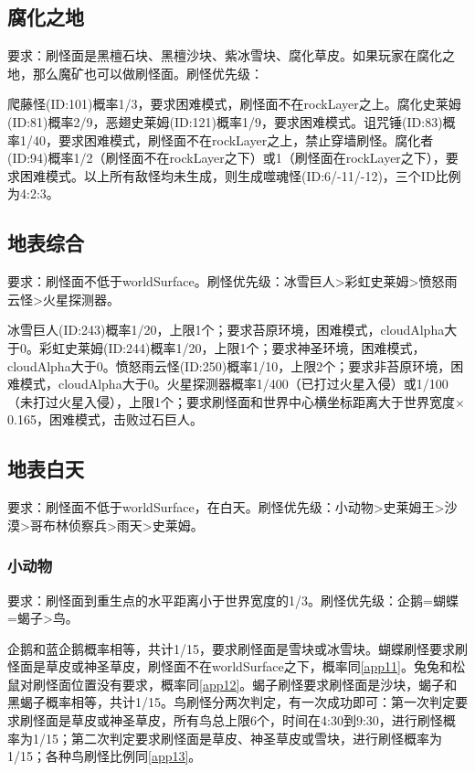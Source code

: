 \subsection{腐化之地}
要求：刷怪面是黑檀石块、黑檀沙块、紫冰雪块、腐化草皮。如果玩家在腐化之地，那么魔矿也可以做刷怪面。刷怪优先级：

爬藤怪(ID:101)概率1/3，要求困难模式，刷怪面不在rockLayer之上。腐化史莱姆(ID:81)概率2/9，恶翅史莱姆(ID:121)概率1/9，要求困难模式。诅咒锤(ID:83)概率1/40，要求困难模式，刷怪面不在rockLayer之上，禁止穿墙刷怪。腐化者(ID:94)概率1/2（刷怪面不在rockLayer之下）或1（刷怪面在rockLayer之下），要求困难模式。以上所有敌怪均未生成，则生成噬魂怪(ID:6/-11/-12)，三个ID比例为4:2:3。

\subsection{地表综合}
要求：刷怪面不低于worldSurface。刷怪优先级：冰雪巨人>彩虹史莱姆>愤怒雨云怪>火星探测器。

冰雪巨人(ID:243)概率1/20，上限1个；要求苔原环境，困难模式，cloudAlpha大于0。彩虹史莱姆(ID:244)概率1/20，上限1个；要求神圣环境，困难模式，cloudAlpha大于0。愤怒雨云怪(ID:250)概率1/10，上限2个；要求非苔原环境，困难模式，cloudAlpha大于0。火星探测器概率1/400（已打过火星入侵）或1/100（未打过火星入侵），上限1个；要求刷怪面和世界中心横坐标距离大于世界宽度$\times$0.165，困难模式，击败过石巨人。

\subsection{地表白天}
要求：刷怪面不低于worldSurface，在白天。刷怪优先级：小动物>史莱姆王>沙漠>哥布林侦察兵>雨天>史莱姆。

\subsubsection{小动物}
要求：刷怪面到重生点的水平距离小于世界宽度的1/3。刷怪优先级：企鹅=蝴蝶=蝎子>鸟。

企鹅和蓝企鹅概率相等，共计1/15，要求刷怪面是雪块或冰雪块。蝴蝶刷怪要求刷怪面是草皮或神圣草皮，刷怪面不在worldSurface之下，概率同\autoref{app11}。兔兔和松鼠对刷怪面位置没有要求，概率同\autoref{app12}。蝎子刷怪要求刷怪面是沙块，蝎子和黑蝎子概率相等，共计1/15。鸟刷怪分两次判定，有一次成功即可：第一次判定要求刷怪面是草皮或神圣草皮，所有鸟总上限6个，时间在4:30到9:30，进行刷怪概率为1/15；第二次判定要求刷怪面是草皮、神圣草皮或雪块，进行刷怪概率为1/15；各种鸟刷怪比例同\autoref{app13}。

